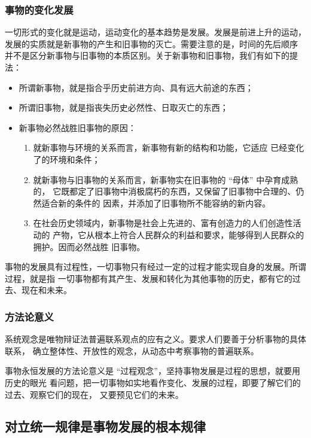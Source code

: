 \documentclass[10pt, UTF8]{book} %
\begin{document}
\subsubsection{事物的变化发展}

一切形式的变化就是运动，运动变化的基本趋势是发展。发展是前进上升的运动，
发展的实质就是新事物的产生和旧事物的灭亡。需要注意的是，时间的先后顺序
并不是区分新事物与旧事物的本质区别。关于新事物和旧事物，我们有如下的提法：
\begin{itemize}[itemsep=0pt]
    \item 所谓新事物，就是指合乎历史前进方向、具有远大前途的东西；
    \item 所谓旧事物，就是指丧失历史必然性、日取灭亡的东西；
    \item 新事物必然战胜旧事物的原因：
    \begin{enumerate}[label={${\arabic*}^\circ$}, itemsep=0pt]
        \item 就新事物与环境的关系而言，新事物有新的结构和功能，它适应
        已经变化了的环境和条件；
        \item 就新事物与旧事物的关系而言，新事物实在旧事物的 “母体” 中孕育成熟的，
        它既都定了旧事物中消极腐朽的东西，又保留了旧事物中合理的、仍然适合新的条件的
        因素，并添加了旧事物所不能容纳的新内容。
        \item 在社会历史领域内，新事物是社会上先进的、富有创造力的人们创造性活动的
        产物，它从根本上符合人民群众的利益和要求，能够得到人民群众的拥护。因而必然战胜
        旧事物。
    \end{enumerate}
\end{itemize}
事物的发展具有过程性，一切事物只有经过一定的过程才能实现自身的发展。所谓过程，就是指
一切事物都有其产生、发展和转化为其他事物的历史，都有它的过去、现在和未来。

\subsubsection{方法论意义}

系统观念是唯物辩证法普遍联系观点的应有之义。要求人们要善于分析事物的具体联系，
确立整体性、开放性的观念，从动态中考察事物的普遍联系。

事物永恒发展的方法论意义是 “过程观念”，坚持事物发展是过程的思想，就要用历史的眼光
看问题，把一切事物如实地看作变化、发展的过程，即要了解它们的过去、观察它们的现在，
又要预见它们的未来。

\subsection{对立统一规律是事物发展的根本规律}
\end{document}
